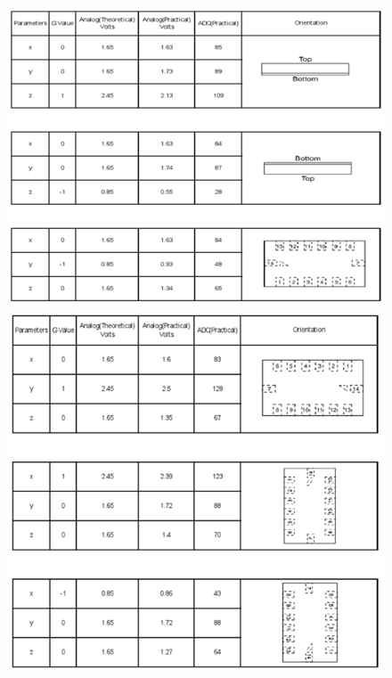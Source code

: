 \documentclass[a4paper,12 pt]{article}
\begin{document}
\begin{figure}[!h]
\begin{center}
\includegraphics[]{acc4.png}
\label{fig:5}
\includegraphics[]{acc5.png}
\label{fig:6}
\end{center}
\end{figure}
\pagebreak
\end{document}
